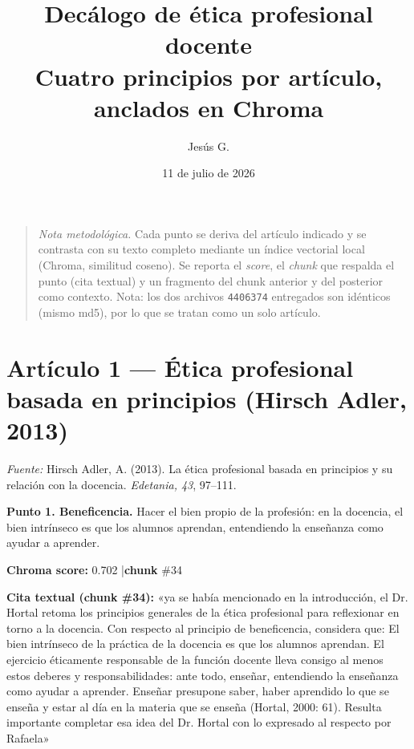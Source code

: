 \documentclass[11pt]{article}
\title{\vspace{-2em}\bfseries Decálogo de ética profesional docente\\[2pt]\large Cuatro principios por artículo, anclados en Chroma}
\author{Jesús G.}\date{11 de julio de 2026}
\newcommand{\score}[2]{{\small\textbf{Chroma score:} #1 \quad|\quad \textbf{chunk} \##2}}
\begin{document}
\maketitle\thispagestyle{empty}
\begin{quote}\small\textit{Nota metodológica.} Cada punto se deriva del artículo indicado y se contrasta con su texto completo mediante un índice vectorial local (Chroma, similitud coseno). Se reporta el \emph{score}, el \emph{chunk} que respalda el punto (cita textual) y un fragmento del chunk anterior y del posterior como contexto. Nota: los dos archivos \texttt{4406374} entregados son idénticos (mismo md5), por lo que se tratan como un solo artículo.\end{quote}
\vspace{0.4em}
\section*{Art\'iculo 1 --- \'Etica profesional basada en principios (Hirsch Adler, 2013)}
{\small\textit{Fuente: }Hirsch Adler, A. (2013). La \'etica profesional basada en principios y su relaci\'on con la docencia. \textit{Edetania, 43}, 97--111.}\par\vspace{0.4em}
\noindent\textbf{Punto 1. Beneficencia.} Hacer el bien propio de la profesi\'on: en la docencia, el bien intr\'inseco es que los alumnos aprendan, entendiendo la ense\~nanza como ayudar a aprender.\par
\score{0.702}{34}\par\smallskip
{}\par\smallskip
\begin{mdframed}[backgroundcolor=qbg,linecolor=qrule,linewidth=1pt,leftline=true,topline=false,bottomline=false,rightline=false,innerleftmargin=8pt,innertopmargin=6pt,innerbottommargin=6pt]
{\small\textbf{Cita textual (chunk \#34):} «ya se había mencionado en la introducción, el Dr. Hortal retoma los principios generales de la ética profesional para reflexionar en torno a la docencia. Con respecto al principio de beneficencia, considera que: El bien intrínseco de la práctica de la docencia es que los alumnos aprendan. El ejercicio éticamente responsable de la función docente lleva consigo al menos estos deberes y responsabilidades: ante todo, enseñar, entendiendo la enseñanza como ayudar a aprender. Enseñar presupone saber, haber aprendido lo que se enseña y estar al día en la materia que se enseña (Hortal, 2000: 61). Resulta importante completar esa idea del Dr. Hortal con lo expresado al respecto por Rafaela»}
\end{mdframed}
\end{document}
